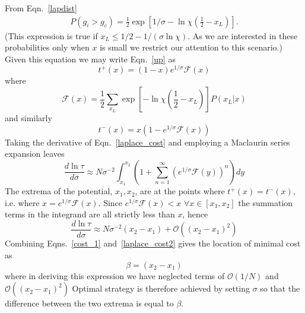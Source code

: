 \documentclass[aps,prl,twocolumn,showpacs,superscriptaddress,groupedaddress]{revtex4}
\begin{document}
From Eqn.~\ref{lapdist}
\begin{align}
P\left(g_i>g_c \right) =
\frac{1}{2}\exp{\left[1/\sigma - \ln\chi  \left(\frac{1}{2}-x_L\right)\right] }.%
\end{align}
(This expression is true if $x_L \le 1/2 - 1/(\sigma\ln\chi)$. As we are interested in these probabilities only when $x$ is small we restrict our attention to this scenario.) Given this equation we may write Eqn.~\ref{up} as
\begin{equation}
t^+(x) = (1-x)  e^{1/\sigma } \mathcal{F}(x)
\end{equation}
where 
\begin{equation}
 \mathcal{F}(x) = \frac{1}{2}\sum_{x_{L}}\exp{\left[ - \ln\chi  \left(\frac{1}{2}-x_L\right)\right]}P\left(x_{L}|x\right)
 \label{social}
\end{equation}
and similarly 
\begin{equation}
t^-(x) =x \left(1-  e^{1/\sigma } \mathcal{F}(x)\right)
\end{equation}
Taking the derivative of Eqn.~\ref{laplace_cost} and employing a Maclaurin series expansion leaves
\begin{equation}
  \frac{d \ln \tau}{d \sigma} \approx N \sigma^{-2} \int_{x_1}^{x_2} \left(1 + \sum_{n=1}^{\infty} \left(e^{1/\sigma } \mathcal{F}(y)\right)^n  \right) dy
\label{laplace_cost2}
\end{equation}
The extrema of the potential, $x_1,x_2$, are at the points where $t^+(x)=t^-(x)$, i.e. where $x=e^{1/\sigma } \mathcal{F}(x)$. Since $e^{1/\sigma } \mathcal{F}(x)<x$ $\forall x \in [x_1,x_2]$ the summation terms in the integrand are all strictly less than $x$, hence
\begin{equation}
  \frac{d \ln \tau}{d \sigma} \approx  N \sigma^{-2} \left({x_2}-{x_1}\right) + \mathcal{O}\left( \left(x_2-x_1\right)^2\right)
\label{laplace_cost2}
\end{equation}
Combining Eqns.~\ref{cost_1} and~\ref{laplace_cost2} gives the location of minimal cost as
\begin{equation}
  \beta =  \left({x_2}-{x_1}\right) 
\label{laplace_cost_final}
\end{equation}
where in deriving this expression we have neglected terms of $\mathcal{O}(1/N)$ and $\mathcal{O}\left( \left(x_2-x_1\right)^2\right)$
Optimal strategy is therefore achieved by setting $\sigma$ so that the difference between the two extrema is equal to $\beta$.
\end{document}
